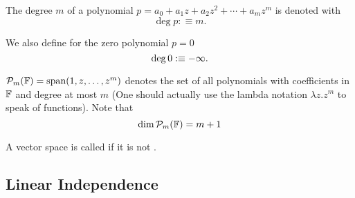 \begin{mydef}
  The degree $m$ of a polynomial $p=a_0+a_1z+a_2z^2+\cdots+a_mz^m$ is denoted with \begin{equation}
    \deg p :\equiv m.
  \end{equation}

  We also define for the zero polynomial $p=0$
  \begin{equation}
    {\operatorname{deg} \,} 0 : \equiv -\infty.
  \end{equation}
\end{mydef}

\begin{mydef}
  $\mathcal{P}_m (\mathbb{F} )=\operatorname{span} (1,z,\dots,z^m)$ denotes the set of all polynomials with coefficients in $\mathbb{F}$ and degree at most $m$ (One should actually use the lambda notation $\lambda z.z^m$ to speak of functions). Note that
  \begin{equation}
    \dim \mathcal{P}_m(\mathbb{F}) = m+1
  \end{equation}
\end{mydef}

\setcounter{thm}{12}
\begin{mydef}
  A vector space is called  if it is not \fd.
\end{mydef}


\subsection{Linear Independence}

